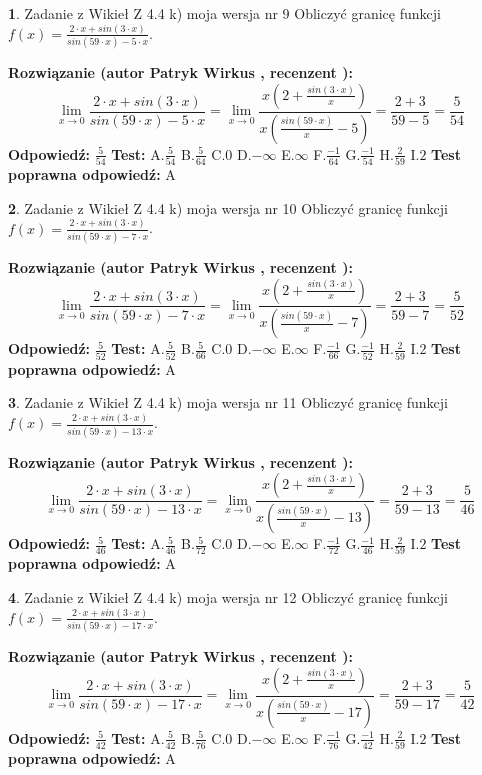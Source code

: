 \documentclass[12pt, a4paper]{article}
\theoremstyle{definition} %
\newtheorem{zad}{}
\newcommand{\zadStart}[1]{\begin{zad}#1\newline}
\newcommand{\zadStop}{\end{zad}}
\newcommand{\rozwStart}[2]{\noindent \textbf{Rozwiązanie (autor #1 , recenzent #2): }\newline}
\newcommand{\rozwStop}{\newline}
\newcommand{\odpStart}{\noindent \textbf{Odpowiedź:}\newline}
\newcommand{\odpStop}{\newline}
\newcommand{\testStart}{\noindent \textbf{Test:}\newline}
\newcommand{\testStop}{\newline}
\newcommand{\kluczStart}{\noindent \textbf{Test poprawna odpowiedź:}\newline}
\newcommand{\kluczStop}{\newline}
\begin{document}
\zadStart{Zadanie z Wikieł Z 4.4 k) moja wersja nr 9}
Obliczyć granicę funkcji $f(x)=\frac{2\cdot x +sin(3\cdot x)}{sin(59\cdot x) -5\cdot x}$.
\zadStop
\rozwStart{Patryk Wirkus}{}
$$\lim\limits_{x\to 0}\frac{2\cdot x +sin(3\cdot x)}{sin(59\cdot x) -5\cdot x}
=\lim\limits_{x\to 0}\frac{x(2+\frac{sin(3\cdot x)}{x})}{x(\frac{sin(59\cdot x)}{x}-5)}
=\frac{2+3}{59-5} = \frac{5}{54}$$
\rozwStop
\odpStart
$\frac{5}{54}$
\odpStop
\testStart
A.$\frac{5}{54}$
B.$\frac{5}{64}$
C.$0$
D.$-\infty$
E.$\infty$
F.$\frac{-1}{64}$
G.$\frac{-1}{54}$
H.$\frac{2}{59}$
I.$2$
\testStop
\kluczStart
A
\kluczStop



\zadStart{Zadanie z Wikieł Z 4.4 k) moja wersja nr 10}
Obliczyć granicę funkcji $f(x)=\frac{2\cdot x +sin(3\cdot x)}{sin(59\cdot x) -7\cdot x}$.
\zadStop
\rozwStart{Patryk Wirkus}{}
$$\lim\limits_{x\to 0}\frac{2\cdot x +sin(3\cdot x)}{sin(59\cdot x) -7\cdot x}
=\lim\limits_{x\to 0}\frac{x(2+\frac{sin(3\cdot x)}{x})}{x(\frac{sin(59\cdot x)}{x}-7)}
=\frac{2+3}{59-7} = \frac{5}{52}$$
\rozwStop
\odpStart
$\frac{5}{52}$
\odpStop
\testStart
A.$\frac{5}{52}$
B.$\frac{5}{66}$
C.$0$
D.$-\infty$
E.$\infty$
F.$\frac{-1}{66}$
G.$\frac{-1}{52}$
H.$\frac{2}{59}$
I.$2$
\testStop
\kluczStart
A
\kluczStop



\zadStart{Zadanie z Wikieł Z 4.4 k) moja wersja nr 11}
Obliczyć granicę funkcji $f(x)=\frac{2\cdot x +sin(3\cdot x)}{sin(59\cdot x) -13\cdot x}$.
\zadStop
\rozwStart{Patryk Wirkus}{}
$$\lim\limits_{x\to 0}\frac{2\cdot x +sin(3\cdot x)}{sin(59\cdot x) -13\cdot x}
=\lim\limits_{x\to 0}\frac{x(2+\frac{sin(3\cdot x)}{x})}{x(\frac{sin(59\cdot x)}{x}-13)}
=\frac{2+3}{59-13} = \frac{5}{46}$$
\rozwStop
\odpStart
$\frac{5}{46}$
\odpStop
\testStart
A.$\frac{5}{46}$
B.$\frac{5}{72}$
C.$0$
D.$-\infty$
E.$\infty$
F.$\frac{-1}{72}$
G.$\frac{-1}{46}$
H.$\frac{2}{59}$
I.$2$
\testStop
\kluczStart
A
\kluczStop



\zadStart{Zadanie z Wikieł Z 4.4 k) moja wersja nr 12}
Obliczyć granicę funkcji $f(x)=\frac{2\cdot x +sin(3\cdot x)}{sin(59\cdot x) -17\cdot x}$.
\zadStop
\rozwStart{Patryk Wirkus}{}
$$\lim\limits_{x\to 0}\frac{2\cdot x +sin(3\cdot x)}{sin(59\cdot x) -17\cdot x}
=\lim\limits_{x\to 0}\frac{x(2+\frac{sin(3\cdot x)}{x})}{x(\frac{sin(59\cdot x)}{x}-17)}
=\frac{2+3}{59-17} = \frac{5}{42}$$
\rozwStop
\odpStart
$\frac{5}{42}$
\odpStop
\testStart
A.$\frac{5}{42}$
B.$\frac{5}{76}$
C.$0$
D.$-\infty$
E.$\infty$
F.$\frac{-1}{76}$
G.$\frac{-1}{42}$
H.$\frac{2}{59}$
I.$2$
\testStop
\kluczStart
A
\kluczStop
\end{document}
